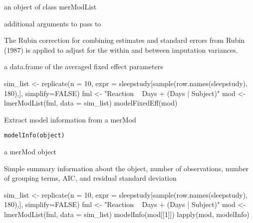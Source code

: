 \documentclass[letterpaper]{book}
\begin{document}
%
\begin{Arguments}
\begin{ldescription}
\item[\code{modList}] an object of class merModList

\item[\code{...}] additional arguments to pass to 
\end{ldescription}
\end{Arguments}
%
\begin{Details}\relax
The Rubin correction for combining estimates and standard errors from
Rubin (1987) is applied to adjust for the within and between imputation variances.
\end{Details}
%
\begin{Value}
a data.frame of the averaged fixed effect parameters
\end{Value}
%
\begin{Examples}
\begin{ExampleCode}
sim_list <- replicate(n = 10,
        expr = sleepstudy[sample(row.names(sleepstudy), 180),],
        simplify=FALSE)
fml <- "Reaction ~ Days + (Days | Subject)"
mod <- lmerModList(fml, data = sim_list)
modelFixedEff(mod)
\end{ExampleCode}
\end{Examples}
%
\begin{Description}\relax
Extract model information from a merMod
\end{Description}
%
\begin{Usage}
\begin{verbatim}
modelInfo(object)
\end{verbatim}
\end{Usage}
%
\begin{Arguments}
\begin{ldescription}
\item[\code{object}] a merMod object
\end{ldescription}
\end{Arguments}
%
\begin{Value}
Simple summary information about the object, number
of observations, number of grouping terms, AIC, and residual standard deviation
\end{Value}
%
\begin{Examples}
\begin{ExampleCode}
sim_list <- replicate(n = 10,
        expr = sleepstudy[sample(row.names(sleepstudy), 180),],
        simplify=FALSE)
fml <- "Reaction ~ Days + (Days | Subject)"
mod <- lmerModList(fml, data = sim_list)
modelInfo(mod[[1]])
lapply(mod, modelInfo)
\end{ExampleCode}
\end{Examples}
\end{document}
